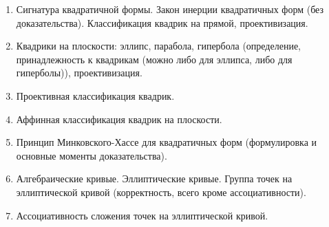 \documentclass[12pt]{article}
\begin{document}
\begin{enumerate}
    \item Сигнатура квадратичной формы. Закон инерции квадратичных форм (без доказательства). Классификация квадрик на прямой, проективизация.

    \item  Квадрики на плоскости: эллипс, парабола, гипербола (определение, принадлежность к квадрикам (можно либо для эллипса, либо для гиперболы)), проективизация.

    \item Проективная классификация квадрик.

    \item Аффинная классификация квадрик на плоскости.

    \item Принцип Минковского-Хассе для квадратичных форм (формулировка и основные моменты доказательства).

    \item Алгебраические кривые. Эллиптические кривые. Группа точек на эллиптической кривой (корректность, всего кроме ассоциативности).

    \item Ассоциативность сложения точек на эллиптической кривой.

\end{enumerate}
\end{document}
